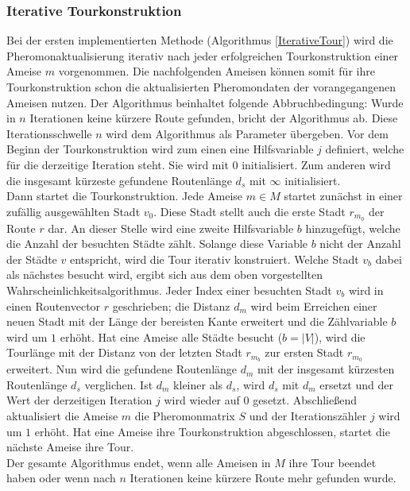 \documentclass[doktyp=barbeit, sprache=german]{TUBAFarbeiten}
\begin{document}
\subsubsection{Iterative Tourkonstruktion}
Bei der ersten implementierten Methode (Algorithmus \ref{IterativeTour}) wird die Pheromonaktualisierung iterativ nach jeder erfolgreichen Tourkonstruktion einer Ameise $m$ vorgenommen. Die nachfolgenden Ameisen können somit für ihre Tourkonstruktion schon die aktualisierten Pheromondaten der vorangegangenen Ameisen nutzen. Der Algorithmus beinhaltet folgende Abbruchbedingung: Wurde in $n$ Iterationen keine kürzere Route gefunden, bricht der Algorithmus ab. Diese Iterationsschwelle $n$ wird dem Algorithmus als Parameter übergeben. Vor dem Beginn der Tourkonstruktion wird zum einen eine Hilfsvariable $j$ definiert, welche für die derzeitige Iteration steht. Sie wird mit $0$ initialisiert. Zum anderen wird die insgesamt kürzeste gefundene Routenlänge $d_s$ mit $\infty$ initialisiert. 
\\Dann startet die Tourkonstruktion. Jede Ameise $m \in M$ startet zunächst in einer zufällig ausgewählten Stadt $v_0$. Diese Stadt stellt auch die erste Stadt $r_{m_0}$ der Route $r$ dar. An dieser Stelle wird eine zweite Hilfsvariable $b$ hinzugefügt, welche die Anzahl der besuchten Städte zählt. Solange diese Variable $b$ nicht der Anzahl der Städte $v$ entspricht, wird die Tour iterativ konstruiert. Welche Stadt $v_b$ dabei als nächstes besucht wird, ergibt sich aus dem oben vorgestellten Wahrscheinlichkeitsalgorithmus. Jeder Index einer besuchten Stadt $v_b$ wird in einen Routenvector $r$ geschrieben; die Distanz $d_m$ wird beim Erreichen einer neuen Stadt mit der Länge der bereisten Kante erweitert und die Zählvariable $b$ wird um $1$ erhöht. Hat eine Ameise alle Städte besucht ($b = |V|$), wird die Tourlänge mit der Distanz von der letzten Stadt $r_{m_b}$ zur ersten Stadt $r_{m_0}$ erweitert. Nun wird die gefundene Routenlänge $d_m$ mit der insgesamt kürzesten Routenlänge $d_s$ verglichen. Ist $d_m$ kleiner als $d_s$, wird $d_s$ mit $d_m$ ersetzt und der Wert der derzeitigen Iteration $j$ wird wieder auf $0$ gesetzt. Abschließend aktualisiert die Ameise $m$ die Pheromonmatrix $S$ und der Iterationszähler $j$ wird um $1$ erhöht. Hat eine Ameise ihre Tourkonstruktion abgeschlossen, startet die nächste Ameise ihre Tour.
\\Der gesamte Algorithmus endet, wenn alle Ameisen in $M$ ihre Tour beendet haben oder wenn nach  $n$ Iterationen keine kürzere Route mehr gefunden wurde. 
\end{document}
